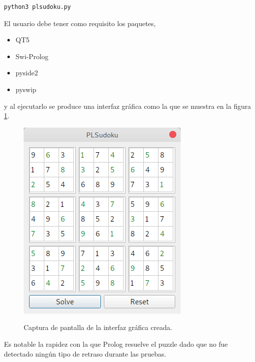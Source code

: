 \documentclass[10pt,a4paper]{article}
\begin{document}
\begin{lstlisting}
python3 plsudoku.py
\end{lstlisting}

El usuario debe tener como requisito los paquetes,
\begin{itemize}
	\item QT5
	\item Swi-Prolog
	\item pyside2
	\item pyswip
\end{itemize}

y al ejecutarlo se produce una interfaz gráfica como la que se muestra en la figura \ref{fig:gui}.

\begin{figure}[h!tb!]
	\centering
	\includegraphics[scale=0.45]{../img/screenshot}
	\label{fig:gui}
	\caption{Captura de pantalla de la interfaz gráfica creada.}
\end{figure}

Es notable la rapidez con la que Prolog resuelve el puzzle dado que no fue detectado ningún tipo de retraso durante las pruebas.
\end{document}

